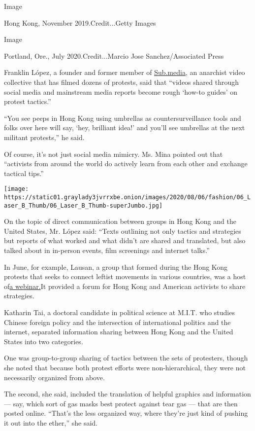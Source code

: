 Image

Hong Kong, November 2019.Credit...Getty Images

Image

Portland, Ore., July 2020.Credit...Marcio Jose Sanchez/Associated Press

Franklin López, a founder and former member of
\href{https://sub.media/}{Sub.media}, an anarchist video collective that
has filmed dozens of protests, said that ``videos shared through social
media and mainstream media reports become rough `how-to guides' on
protest tactics.''

``You see peeps in Hong Kong using umbrellas as countersurveillance
tools and folks over here will say, `hey, brilliant idea!' and you'll
see umbrellas at the next militant protests,'' he said.

Of course, it's not just social media mimicry. Ms. Mina pointed out that
``activists from around the world do actively learn from each other and
exchange tactical tips.''

\texttt{[image: https://static01.graylady3jvrrxbe.onion/images/2020/08/06/fashion/06\_Laser\_B\_Thumb/06\_Laser\_B\_Thumb-superJumbo.jpg]}

On the topic of direct communication between groups in Hong Kong and the
United States, Mr. López said: ``Texts outlining not only tactics and
strategies but reports of what worked and what didn't are shared and
translated, but also talked about in in-person events, film screenings
and internet talks.''

In June, for example, Lausan, a group that formed during the Hong Kong
protests that seeks to connect leftist movements in various countries,
was a host
of\href{https://lausan.hk/2020/notes-from-black-liberation-and-hong-kong/}{a
webinar.}It provided a forum for Hong Kong and American activists to
share strategies.

Katharin Tai, a doctoral candidate in political science at M.I.T. who
studies Chinese foreign policy and the intersection of international
politics and the internet, separated information sharing between Hong
Kong and the United States into two categories.

One was group-to-group sharing of tactics between the sets of
protesters, though she noted that because both protest efforts were
non-hierarchical, they were not necessarily organized from above.

The second, she said, included the translation of helpful graphics and
information --- say, which sort of gas masks best protect against tear
gas --- that are then posted online. ``That's the less organized way,
where they're just kind of pushing it out into the ether,'' she said.

